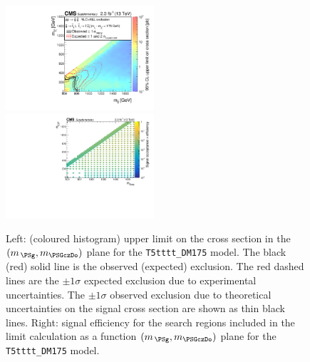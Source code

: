 \begin{figure}[t]
  \begin{center}
    \includegraphics[width=0.49\textwidth]{RA1T5ttttDM175XSEC_aux} \, 
    \includegraphics[width=0.49\textwidth]{T5ttttDM175_merging_4_cats_aux} \,     
  \end{center}
  \caption{Left: (coloured histogram) upper limit on the cross section in the $(m_{\,\PSg}, m_{\PSGczDo})$ plane for the \texttt{T5tttt\_DM175} model. 
  The black (red) solid line is the observed (expected) exclusion. The red dashed lines are the $\pm1\sigma$ expected exclusion due to experimental uncertainties. 
  The $\pm1\sigma$ observed exclusion due to theoretical uncertainties on the signal cross section are shown as thin black lines. 
  Right: signal efficiency for the search regions included in the limit calculation as a function $(m_{\,\PSg}, m_{\PSGczDo})$ plane for the \texttt{T5tttt\_DM175} model. 
  \label{fig:T5ttttDM175_excl}}
\end{figure}


